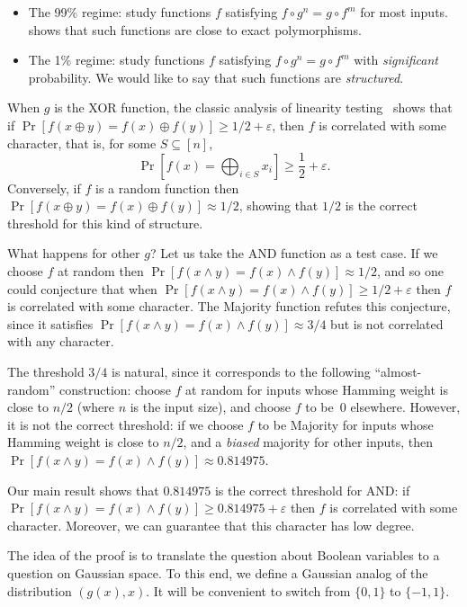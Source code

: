 \documentclass{article}
\theoremstyle{definition}
\theoremstyle{remark}
\newcommand\eps{\varepsilon}
\renewcommand\epsilon{\eps}
\renewcommand\geq{\geqslant}
\begin{document}
\begin{itemize}
    \item The 99\% regime: study functions $f$ satisfying $f \circ g^n = g \circ f^m$ for most inputs.  shows that such functions are close to exact polymorphisms.
    \item The 1\% regime: study functions $f$ satisfying $f \circ g^n = g \circ f^m$ with \emph{significant} probability. We would like to say that such functions are \emph{structured}. 
\end{itemize}

When $g$ is the XOR function, the classic analysis of linearity testing~\cite{Bellare} shows that if $\Pr[f(x \oplus y) = f(x) \oplus f(y)] \geq 1/2 + \epsilon$, then $f$ is correlated with some character, that is, for some $S \subseteq [n]$,
\[
 \Pr\left[f(x) = \bigoplus_{i \in S} x_i \right] \geq \frac{1}{2} + \epsilon.
\]
Conversely, if $f$ is a random function then $\Pr[f(x \oplus y) = f(x) \oplus f(y)] \approx 1/2$, showing that $1/2$ is the correct threshold for this kind of structure.

What happens for other $g$? Let us take the AND function as a test case. If we choose $f$ at random then $\Pr[f(x \land y) = f(x) \land f(y)] \approx 1/2$, and so one could conjecture that when $\Pr[f(x \land y) = f(x) \land f(y)] \geq 1/2 + \epsilon$ then $f$ is correlated with some character. The Majority function refutes this conjecture, since it satisfies $\Pr[f(x \land y) = f(x) \land f(y)] \approx 3/4$ but is not correlated with any character.

The threshold $3/4$ is natural, since it corresponds to the following ``almost-random'' construction: choose $f$ at random for inputs whose Hamming weight is close to $n/2$ (where $n$ is the input size), and choose $f$ to be~$0$ elsewhere. However, it is not the correct threshold: if we choose $f$ to be Majority for inputs whose Hamming weight is close to $n/2$, and a \emph{biased} majority for other inputs, then $\Pr[f(x \land y) = f(x) \land f(y)] \approx 0.814975$.

Our main result shows that $0.814975$ is the correct threshold for AND: if $\Pr[f(x \land y) = f(x) \land f(y)] \geq 0.814975 + \epsilon$ then $f$ is correlated with some character. Moreover, we can guarantee that this character has low degree.

The idea of the proof is to translate the question about Boolean variables to a question on Gaussian space. To this end, we define a Gaussian analog of the distribution $(g(x),x)$. It will be convenient to switch from $\{0,1\}$ to $\{-1,1\}$.
\end{document}
